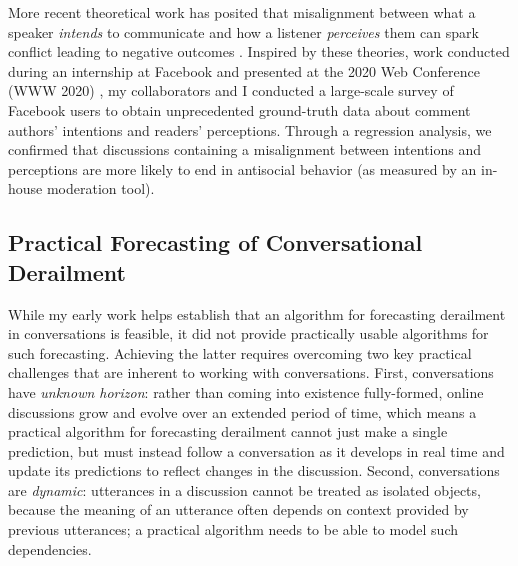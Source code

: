 \documentclass[11pt,letterpaper]{article}
\begin{document}
More recent theoretical work has posited that misalignment between what a speaker \emph{intends} to communicate and how a listener \emph{perceives} them can spark conflict leading to negative outcomes \cite{tannen_indirectness_2000}.
Inspired by these theories, work conducted during an internship at Facebook and presented at the 2020 Web Conference (WWW 2020) \cite{chang_dont_2020}, my collaborators and I conducted a large-scale survey of Facebook users to obtain unprecedented ground-truth data about comment authors' intentions and readers' perceptions.
Through a regression analysis, we confirmed that discussions containing a misalignment between intentions and perceptions are more likely to end in antisocial behavior (as measured by an in-house moderation tool).

\subsection{Practical Forecasting of Conversational Derailment}
While my early work helps establish that an algorithm for forecasting derailment in conversations is feasible, it did not provide practically usable algorithms for such forecasting.
Achieving the latter requires overcoming two key practical challenges that are inherent to working with conversations.
First, conversations have \emph{unknown horizon}: rather than coming into existence fully-formed, online discussions grow and evolve over an extended period of time, which means a practical algorithm for forecasting derailment cannot just make a single prediction, but must instead follow a conversation as it develops in real time and update its predictions to reflect changes in the discussion.
Second, conversations are \emph{dynamic}: utterances in a discussion cannot be treated as isolated objects, because the meaning of an utterance often depends on context provided by previous utterances; a practical algorithm needs to be able to model such dependencies.
\end{document}

